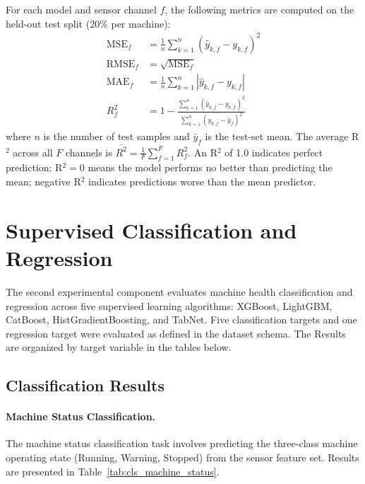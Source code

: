 For each model and sensor channel $f$, the following metrics are computed on the held-out test split (20\% per machine):
\begin{align}
    \text{MSE}_f &= \frac{1}{n}\sum_{k=1}^{n}(\hat{y}_{k,f} - y_{k,f})^2
    \label{eq:mse} \\[4pt]
    \text{RMSE}_f &= \sqrt{\text{MSE}_f}
    \label{eq:rmse} \\[4pt]
    \text{MAE}_f &= \frac{1}{n}\sum_{k=1}^{n}|\hat{y}_{k,f} - y_{k,f}|
    \label{eq:mae} \\[4pt]
    R^2_f &= 1 - \frac{\sum_{k=1}^{n}(\hat{y}_{k,f} - y_{k,f})^2}{\sum_{k=1}^{n}(y_{k,f} - \bar{y}_f)^2}
    \label{eq:r2}
\end{align}
where $n$ is the number of test samples and $\bar{y}_f$ is the test-set mean. The average R$^2$ across all $F$ channels is $\overline{R^2} = \frac{1}{F}\sum_{f=1}^{F} R^2_f$. An R$^2$ of 1.0 indicates perfect prediction; R$^2 = 0$ means the model performs no better than predicting the mean; negative R$^2$ indicates predictions worse than the mean predictor.


\section{Supervised Classification and Regression}

The second experimental component evaluates machine health classification and regression across five supervised learning algorithms: XGBoost, LightGBM, CatBoost, HistGradientBoosting, and TabNet. Five classification targets and one regression target were evaluated as defined in the dataset schema. The Results are organized by target variable in the tables below.

\subsection{Classification Results}

\paragraph{Machine Status Classification.} The machine status classification task involves predicting the three-class machine operating state (Running, Warning, Stopped) from the sensor feature set. Results are presented in Table~\ref{tab:cls_machine_status}.

